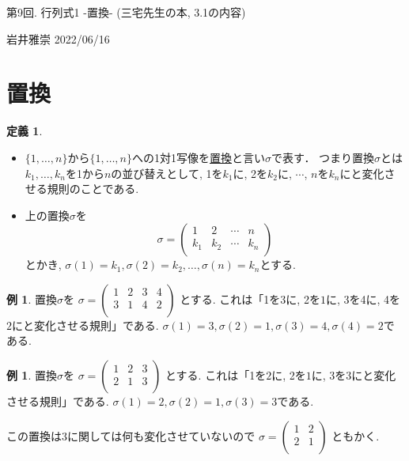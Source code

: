 \documentclass[dvipdfmx,a4paper,11pt]{article}
\theoremstyle{definition}
\newtheorem{dfn}[thm]{定義}
\newtheorem{exa}[thm]{例}
\begin{document}

\begin{center}
{\Large 第9回. 行列式1 -置換- (三宅先生の本, 3.1の内容)}
\end{center}

\begin{flushright}
 岩井雅崇 2022/06/16
\end{flushright}

\section{置換}

\begin{tcolorbox}[
    colback = white,
    colframe = green!35!black,
    fonttitle = \bfseries,
    breakable = true]
    \begin{dfn}
    \text{}
    \begin{itemize}
\item $\{ 1, \ldots, n\}$から$\{ 1, \ldots, n\}$への1対1写像を\underline{置換}と言い$\sigma$で表す．
つまり置換$\sigma$とは$k_1, \ldots, k_n$を1から$n$の並び替えとして, 
1を$k_1$に, 2を$k_2$に, $\cdots$, $n$を$k_n$にと変化させる規則のことである.
\item 上の置換$\sigma$を
$$
\sigma =
  \begin{pmatrix}
 1& 2  &\cdots &n\\
 k_1& k_2  &\cdots &k_n\\
 \end{pmatrix} 
$$
とかき, $\sigma(1) =k_1, \sigma(2) =k_2, \ldots, \sigma(n) =k_n$とする.
    \end{itemize}
  \end{dfn}
 \end{tcolorbox}
 
 \begin{exa}
 置換$\sigma$を
$
\sigma =
  \begin{pmatrix}
 1& 2  &3 &4\\
 3& 1  &4 &2\\
 \end{pmatrix} 
$
とする. 
これは「1を$3$に, 2を$1$に, 3を4に, 4を$2$にと変化させる規則」である.
 $\sigma(1) =3, \sigma(2) =1, \sigma(3) =4,  \sigma(4) =2$である.
 \end{exa}
 
 \begin{exa}
 置換$\sigma$を
$
\sigma =
  \begin{pmatrix}
 1& 2  &3 \\
 2& 1  &3 \\
 \end{pmatrix} 
$
とする. 
これは「1を$2$に, 2を$1$に, 3を3にと変化させる規則」である.
 $\sigma(1) =2, \sigma(2) =1, \sigma(3) =3$である.
 
 この置換は3に関しては何も変化させていないので
 $
\sigma =
  \begin{pmatrix}
 1& 2   \\
 2& 1   \\
 \end{pmatrix} 
$
ともかく.
 \end{exa}
\end{document}
